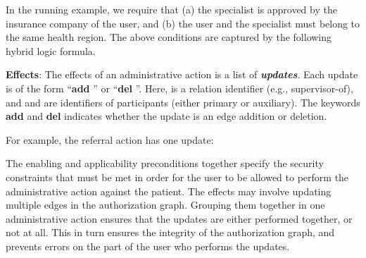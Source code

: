 \documentclass{acm_proc_article-sp}
\newcommand{\Dfn}[1]{\textbf{\emph{#1}}}
\begin{document}
\begin{compactitem}
  In the running example, we require that (a) the \textsf{specialist}
  is approved by the insurance company of the \textsf{user}, and (b)
  the \textsf{user} and the \textsf{specialist} must belong to the
  same health region.  The above conditions are captured by the
  following hybrid logic formula.
  
\item \textbf{Effects}: The effects of an administrative action is a
  list of \Dfn{updates}.  Each update is of the form
  ``\textbf{add} '' or ``\textbf{del} ''.
  Here,  is a relation identifier (e.g., \textsf{supervisor-of}),
  and  and  are identifiers of participants (either primary or
  auxiliary).  The keywords \textbf{add} and \textbf{del} indicates
  whether the update is an edge addition or deletion.

  For example, the referral action has one update:
  
\end{compactitem}
The enabling and applicability preconditions together specify the
security constraints that must be met in order for the \textsf{user}
to be allowed to perform the administrative action against the
\textsf{patient}.  The effects may involve updating multiple edges in
the authorization graph.  Grouping them together in one administrative
action ensures that the updates are either performed together, or not
at all.  This in turn ensures the integrity of the authorization
graph, and prevents errors on the part of the \textsf{user} who
performs the updates.
\end{document}
